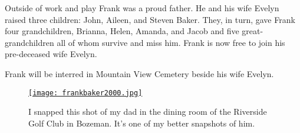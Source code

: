 Outside of work and play Frank was a proud father. He and his wife
Evelyn raised three children: John, Aileen, and Steven Baker. They, in
turn, gave Frank four grandchildren, Brianna, Helen, Amanda, and Jacob
and five great-grandchildren all of whom survive and miss him. Frank is
now free to join his pre-deceased wife Evelyn.

Frank will be interred in Mountain View Cemetery beside his wife Evelyn.

\begin{SCfigure}[50]
\centering
\href{https://conceptcontrol.smugmug.com/People/The-Way-We-Were/i-7mCwg3D/A}{\texttt{[image: frankbaker2000.jpg]}}
\caption{I snapped this shot of my dad in the dining room of the
Riverside Golf Club in Bozeman. It's one of my better snapshots of him.}
\label{fig:7074x3}
\end{SCfigure}




 
 
 
